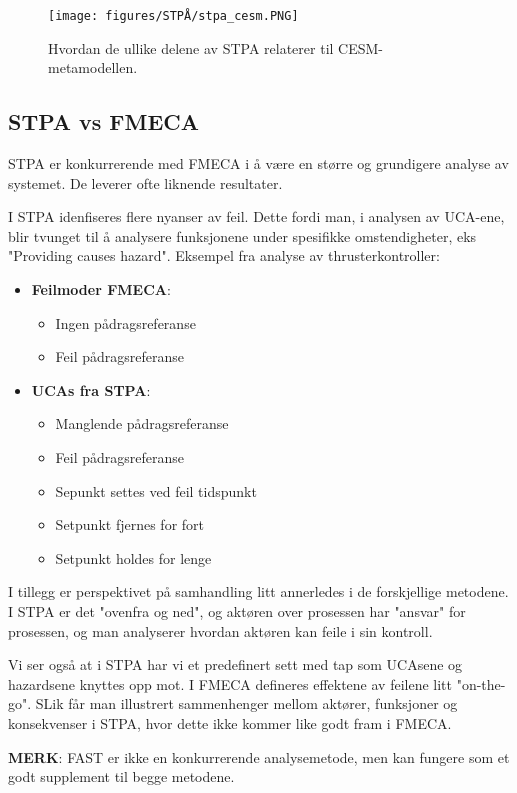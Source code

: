 \begin{figure}[H]
    \centering
        \texttt{[image: figures/STPÅ/stpa\_cesm.PNG]}\\
        \caption{Hvordan de ullike delene av STPA relaterer til CESM-metamodellen.}
\end{figure}


\subsection{STPA vs FMECA}

STPA er konkurrerende med FMECA i å være en større og grundigere analyse av systemet. De leverer ofte liknende resultater. 

I STPA idenfiseres flere nyanser av feil. Dette fordi man, i analysen av UCA-ene, blir tvunget til å analysere funksjonene under spesifikke omstendigheter, eks "Providing causes hazard". Eksempel fra analyse av thrusterkontroller:

\begin{itemize}
    \item \textbf{Feilmoder FMECA}:
    \begin{itemize}
        \item Ingen pådragsreferanse
        \item Feil pådragsreferanse
    \end{itemize}
    \item \textbf{UCAs fra STPA}:
    \begin{itemize}
        \item Manglende pådragsreferanse
        \item Feil pådragsreferanse
        \item Sepunkt settes ved feil tidspunkt
        \item Setpunkt fjernes for fort
        \item Setpunkt holdes for lenge
    \end{itemize}
\end{itemize}

I tillegg er perspektivet på samhandling litt annerledes i de forskjellige metodene. I STPA er det "ovenfra og ned", og aktøren over prosessen har "ansvar" for prosessen, og man analyserer hvordan aktøren kan feile i sin kontroll. 


Vi ser også at i STPA har vi et predefinert sett med tap som UCAsene og hazardsene knyttes opp mot. I FMECA defineres effektene av feilene litt "on-the-go". SLik får man illustrert sammenhenger mellom aktører, funksjoner og konsekvenser i STPA, hvor dette ikke kommer like godt fram i FMECA.


\textbf{MERK}: FAST er ikke en konkurrerende analysemetode, men kan fungere som et godt supplement til begge metodene.
